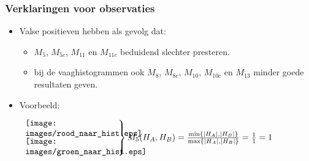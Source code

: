 \documentclass[dutch]{beamer}
\theoremstyle{definition}
\theoremstyle{remark}
\theoremstyle{example}
\begin{document}
{
  \frametitle{Verklaringen voor observaties}
  
  \begin{itemize}
  \item Valse positieven hebben als gevolg dat:
  \begin{itemize}
    \item $M_5$, $M_{5c}$, $M_{11}$ en $M_{11c}$ beduidend slechter presteren.  
    \item bij de vaaghistogrammen ook $M_8$, $M_{8c}$, $M_{10}$, $M_{10c}$ en $M_{13}$
    minder goede resultaten geven. 
  \end{itemize}
  \item Voorbeeld:
  \begin{minipage}{\textwidth}
  \vspace{10pt}
  \small
  $\left. \begin{array}{c}
  \begin{minipage}{0.3\textwidth}
  \texttt{[image: images/rood\_naar\_hist.eps]}
  \end{minipage}\\
  \begin{minipage}{0.3\textwidth}
  \texttt{[image: images/groen\_naar\_hist.eps]}
  \end{minipage}
  \end{array} \right\} M_5(H_A,H_B)=\frac{\min\{|H_A|,|H_B|\}}{\max\{|H_A|,|H_B|\}}=\frac{1}{1}=1$
  \end{minipage}
  \end{itemize}
}
\end{document}
